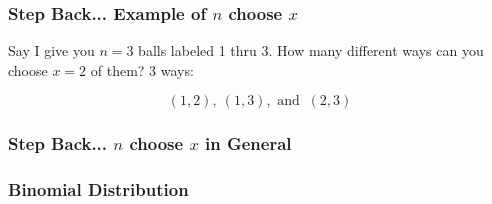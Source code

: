 \documentclass[handout]{beamer}
\newcommand{\blue}[1]{\textcolor{blue2}{#1}}
\begin{document}
\begin{frame}
\frametitle{Step Back... Example of $n$ choose $x$}
Say I give you $n=3$ balls labeled 1 thru 3.  How many different ways can you choose $x=2$ of them?  3 ways:

\[
(1, 2), \ (1, 3), \mbox{ and } \ (2, 3)
\]

\end{frame}



\begin{frame}
\frametitle{Step Back... $n$ choose $x$ in General}

%
%
%
%
%
%

\end{frame}


\begin{frame}
\frametitle{Binomial Distribution}
%
%
%
%

\end{frame}
\end{document}
